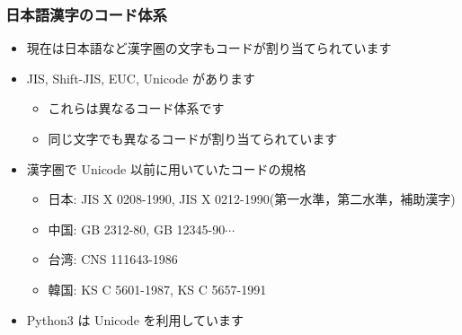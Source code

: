 \begin{frame}
\frametitle{日本語漢字のコード体系}
  \begin{itemize}
\item 現在は日本語など漢字圏の文字もコードが割り当てられています
\item JIS, Shift-JIS, EUC, Unicode があります
    \begin{itemize}
\item これらは異なるコード体系です
\item 同じ文字でも異なるコードが割り当てられています
    \end{itemize}
\item 漢字圏で Unicode 以前に用いていたコードの規格
    \begin{itemize}
\item 日本: JIS X 0208-1990, JIS X 0212-1990(第一水準，第二水準，補助漢字)
\item 中国: GB 2312-80, GB 12345-90$\cdots$
\item 台湾: CNS 111643-1986
\item 韓国: KS C 5601-1987, KS C 5657-1991
    \end{itemize}
\item Python3 は Unicode を利用しています
  \end{itemize}
\end{frame}
